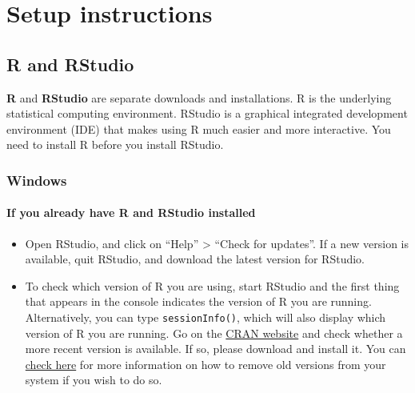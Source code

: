 \documentclass[
  12pt, krantz2,
]{book}
\newcommand{\passthrough}[1]{#1}
\providecommand{\tightlist}{%
  \setlength{\itemsep}{0pt}\setlength{\parskip}{0pt}}
\theoremstyle{definition}
\theoremstyle{definition}
\theoremstyle{definition}
\newcommand{\1}{\mathbbm{1}}
\begin{document}
\hypertarget{setup}{%
\section{Setup instructions}\label{setup}}

\hypertarget{r-and-rstudio}{%
\subsection{R and RStudio}\label{r-and-rstudio}}

\textbf{R} and \textbf{RStudio} are separate downloads and installations. R is the
underlying statistical computing environment. RStudio is a graphical integrated
development environment (IDE) that makes using R much easier and more
interactive. You need to install R before you install RStudio.

\hypertarget{windows}{%
\subsubsection{Windows}\label{windows}}

\hypertarget{if-you-already-have-r-and-rstudio-installed}{%
\paragraph{If you already have R and RStudio installed}\label{if-you-already-have-r-and-rstudio-installed}}

\begin{itemize}
\tightlist
\item
  Open RStudio, and click on ``Help'' \textgreater{} ``Check for updates''. If a new version is
  available, quit RStudio, and download the latest version for RStudio.
\item
  To check which version of R you are using, start RStudio and the first thing
  that appears in the console indicates the version of R you are
  running. Alternatively, you can type \passthrough{\lstinline!sessionInfo()!}, which will also display
  which version of R you are running. Go on the \href{https://cran.r-project.org/bin/windows/base/}{CRAN
  website} and check whether a
  more recent version is available. If so, please download and install it. You
  can \href{https://cran.r-project.org/bin/windows/base/rw-FAQ.html\#How-do-I-UNinstall-R_003f}{check here}
  for more information on how to remove old versions from your system if you
  wish to do so.
\end{itemize}
\end{document}
